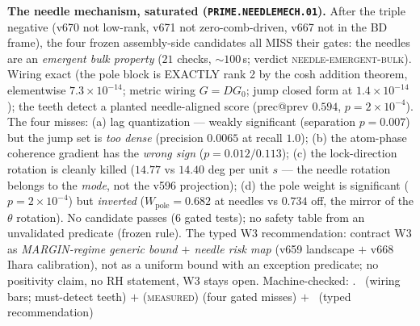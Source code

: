 \par\smallskip\noindent\textbf{The needle mechanism, saturated
(\texttt{PRIME.NEEDLEMECH.01}).}
After the triple negative (v670 not low-rank, v671 not
zero-comb-driven, v667 not in the BD frame), the four frozen
assembly-side candidates all MISS their gates: the needles are an
\emph{emergent bulk property} ($21$ checks, ${\sim}100$\,s; verdict
\textsc{needle-emergent-bulk}).  Wiring exact (the pole block is
EXACTLY rank 2 by the cosh addition theorem, elementwise
$7.3\times10^{-14}$; metric wiring $G=DG_0$; jump closed form at
$1.4\times10^{-14}$); the teeth detect a planted needle-aligned
score (prec@prev $0.594$, $p=2\times10^{-4}$).  The four misses:
(a) lag quantization --- weakly significant (separation $p=0.007$)
but the jump set is \emph{too dense} (precision $0.0065$ at recall
$1.0$); (b) the atom-phase coherence gradient has the \emph{wrong
sign} ($p=0.012/0.113$); (c) the lock-direction rotation is cleanly
killed ($14.77$ vs $14.40$ deg per unit $s$ --- the needle rotation
belongs to the \emph{mode}, not the v596 projection); (d) the pole
weight is significant ($p=2\times10^{-4}$) but \emph{inverted}
($W_{\mathrm{pole}}=0.682$ at needles vs $0.734$ off, the mirror of
the $\theta$ rotation).  No candidate passes (6 gated tests); no
safety table from an unvalidated predicate (frozen rule).  The typed
W3 recommendation: contract W3 as \emph{MARGIN-regime generic bound
$+$ needle risk map} (v659 landscape $+$ v668 Ihara calibration),
not as a uniform bound with an exception predicate; no positivity
claim, no RH statement, W3 stays open.
Machine-checked: .
\mE\ (wiring bars; must-detect teeth) $+$ (\textsc{measured}) (four
gated misses) $+$ \mC\ (typed recommendation)
\par\smallskip


